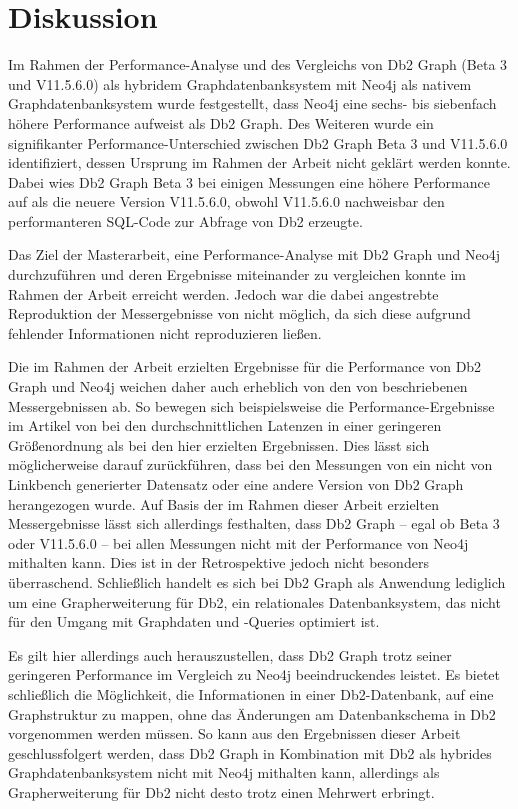 \chapter{Diskussion}
\label{diskussion}
Im Rahmen der Performance-Analyse und des Vergleichs von Db2 Graph (Beta 3 und V11.5.6.0) als hybridem Graphdatenbanksystem mit Neo4j als nativem Graphdatenbanksystem wurde festgestellt, dass Neo4j eine sechs- bis siebenfach höhere Performance aufweist als Db2 Graph. Des Weiteren wurde ein signifikanter Performance-Unterschied zwischen Db2 Graph Beta 3 und V11.5.6.0 identifiziert, dessen Ursprung im Rahmen der Arbeit nicht geklärt werden konnte. Dabei wies Db2 Graph Beta 3 bei einigen Messungen eine höhere Performance auf als die neuere Version V11.5.6.0, obwohl V11.5.6.0 nachweisbar den performanteren SQL-Code zur Abfrage von Db2 erzeugte. 

Das Ziel der Masterarbeit, eine Performance-Analyse mit Db2 Graph und Neo4j durchzuführen und deren Ergebnisse miteinander zu vergleichen konnte im Rahmen der Arbeit erreicht werden. Jedoch war die dabei angestrebte Reproduktion der Messergebnisse von  nicht möglich, da sich diese aufgrund fehlender Informationen nicht reproduzieren ließen. 

Die im Rahmen der Arbeit erzielten Ergebnisse für die Performance von Db2 Graph und Neo4j weichen daher auch erheblich von den von  beschriebenen Messergebnissen ab. So bewegen sich beispielsweise die Performance-Ergebnisse im Artikel von  bei den durchschnittlichen Latenzen in einer geringeren Größenordnung als bei den hier erzielten Ergebnissen. Dies lässt sich möglicherweise darauf zurückführen, dass bei den Messungen von  ein nicht von Linkbench generierter Datensatz oder eine andere Version von Db2 Graph herangezogen wurde. Auf Basis der im Rahmen dieser Arbeit erzielten Messergebnisse lässt sich allerdings festhalten, dass Db2 Graph -- egal ob Beta 3 oder V11.5.6.0 -- bei allen Messungen nicht mit der Performance von Neo4j mithalten kann. Dies ist in der Retrospektive jedoch nicht besonders überraschend. Schließlich handelt es sich bei Db2 Graph als Anwendung lediglich um eine Grapherweiterung für Db2, ein relationales Datenbanksystem, das nicht für den Umgang mit Graphdaten und -Queries optimiert ist. 

Es gilt hier allerdings auch herauszustellen, dass Db2 Graph trotz seiner geringeren Performance im Vergleich zu Neo4j beeindruckendes leistet. Es bietet schließlich die Möglichkeit, die Informationen in einer Db2-Datenbank, auf eine Graphstruktur zu mappen, ohne das Änderungen am Datenbankschema in Db2 vorgenommen werden müssen. So kann aus den Ergebnissen dieser Arbeit geschlussfolgert werden, dass Db2 Graph in Kombination mit Db2 als hybrides Graphdatenbanksystem nicht mit Neo4j mithalten kann, allerdings als Grapherweiterung für Db2 nicht desto trotz einen Mehrwert erbringt. 

